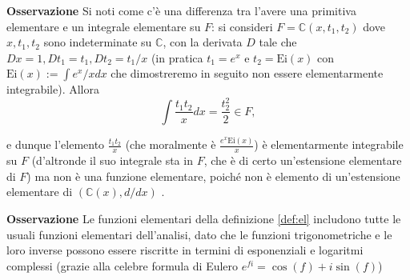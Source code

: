 \documentclass[10pt,oneside]{article}
\theoremstyle{definition}
\theoremstyle{plain}
\theoremstyle{definition}
\theoremstyle{plain}
\theoremstyle{plain}
\newcommand{\C}{\mathbb{C}}
\newcommand{\Ei}{\mathrm{Ei}}
\begin{document}
\textbf{Osservazione} Si noti come c'è una differenza tra l'avere una primitiva elementare e un integrale elementare su $F$: si consideri $F=\C(x,t_1,t_2)$ dove $x,t_1,t_2$ sono indeterminate su $\C$, con la derivata $D$ tale che $Dx=1, Dt_1=t_1, Dt_2=t_1/x$ (in pratica $t_1=e^x$ e $t_2=\Ei(x)$ con $\Ei(x):=\int e^x/x dx$ che dimostreremo in seguito non essere elementarmente integrabile). Allora
\[\int \frac{t_1 t_2 }{x}dx=\frac{t_2^2}{2} \in F, \]

e dunque l'elemento $\frac{t_1 t_2}{x}$ (che moralmente è $\frac{e^x\Ei(x)}{x}$) è elementarmente integrabile su  $F$ (d'altronde il suo integrale sta in $F$, che è di certo un'estensione elementare di $F$) ma non è una funzione elementare, poiché non è elemento di un'estensione elementare di $( \C(x), d/dx)$ .

\textbf{Osservazione} Le funzioni elementari della definizione \ref{def:el} includono tutte le usuali funzioni elementari dell'analisi, dato che le funzioni trigonometriche e le loro inverse possono essere riscritte in termini di esponenziali e logaritmi complessi (grazie alla celebre formula di Eulero $e^{fi}=\cos(f)+i\sin(f) $)
\end{document}
